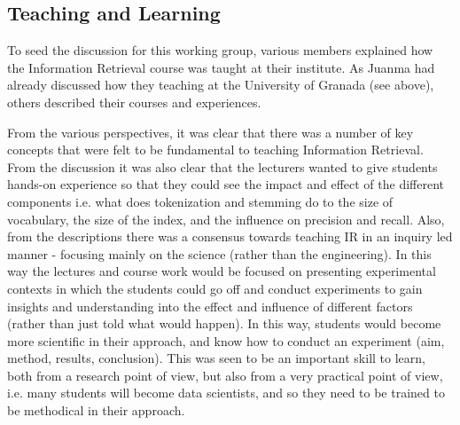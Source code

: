 \subsection{Teaching and Learning}
\label{sec:teaching}

To seed the discussion for this working group, various members explained how the Information Retrieval course was taught at their institute. As Juanma had already discussed how they teaching at the University of Granada (see above), others described their courses and experiences. 





From the various perspectives, it was clear that there was a number of key concepts that were felt to be fundamental to teaching Information Retrieval. From the discussion it was also clear that the lecturers wanted to give students hands-on experience so that they could see the impact and effect of the different components i.e. what does tokenization and stemming do to the size of vocabulary, the size of the index, and the influence on precision and recall. Also, from the descriptions there was a consensus towards teaching IR in an inquiry led manner - focusing mainly on the science (rather than the engineering). In this way the lectures and course work would be focused on presenting experimental contexts in which the students could go off and conduct experiments to gain insights and understanding into the effect and influence of different factors (rather than just told what would happen). In this way, students would become more scientific in their approach, and know how to conduct an experiment (aim, method, results, conclusion). This was seen to be an important skill to learn, both from a research point of view, but also from a very practical point of view, i.e. many students will become data scientists, and so they need to be trained to be methodical in their approach.

